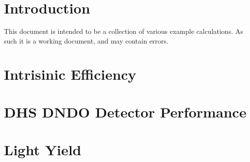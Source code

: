 \documentclass{article}
\begin{document}
\printnomenclature
\printindex
\section{Introduction}
This document is intended to be a collection of various example calculations.
As such it is a working document, and may contain errors.

\section{Intrisinic Efficiency}

\section{DHS DNDO Detector Performance}

\section{Light Yield}

\end{document}
